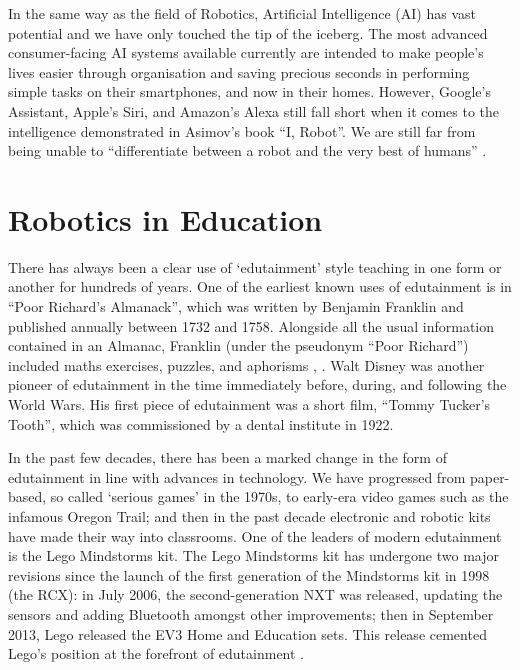 \documentclass{report}
\begin{document}
    In the same way as the field of Robotics, Artificial Intelligence (AI) has vast potential and we have only touched the tip of the iceberg. The most advanced consumer-facing AI systems available currently are intended to make people's lives easier through organisation and saving precious seconds in performing simple tasks on their smartphones, and now in their homes. However, Google's Assistant, Apple's Siri, and Amazon's Alexa still fall short when it comes to the intelligence demonstrated in Asimov's book \enquote{I, Robot}. We are still far from being unable to \enquote{differentiate between a robot and the very best of humans} \cite{Asimov1970}.
    
    \section{Robotics in Education}
    There has always been a clear use of ‘edutainment’ style teaching in one form or another for hundreds of years. One of the earliest known uses of edutainment is in \enquote{Poor Richard's Almanack}, which was written by Benjamin Franklin and published annually between 1732 and 1758. Alongside all the usual information contained in an Almanac, Franklin (under the pseudonym \enquote{Poor Richard}) included maths exercises, puzzles, and aphorisms \cite{Beato2015}, \cite{Franklin1732}. Walt Disney was another pioneer of edutainment in the time immediately before, during, and following the World Wars. His first piece of edutainment was a short film, \enquote{Tommy Tucker’s Tooth}, which was commissioned by a dental institute in 1922.
    
    In the past few decades, there has been a marked change in the form of edutainment in line with advances in technology. We have progressed from paper-based, so called ‘serious games’ in the 1970s, to early-era video games such as the infamous Oregon Trail; and then in the past decade electronic and robotic kits have made their way into classrooms. One of the leaders of modern edutainment is the Lego Mindstorms kit. The Lego Mindstorms kit has undergone two major revisions since the launch of the first generation of the Mindstorms kit in 1998 (the RCX): in July 2006, the second-generation NXT was released, updating the sensors and adding Bluetooth amongst other improvements; then in September 2013, Lego released the EV3 Home and Education sets. This release cemented Lego’s position at the forefront of edutainment \cite{Becker}.
    
\end{document}
